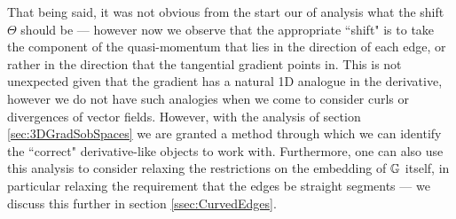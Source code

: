 That being said, it was not obvious from the start our of analysis what the shift $\Theta$ should be --- however now we observe that the appropriate ``shift" is to take the component of the quasi-momentum that lies in the direction of each edge, or rather in the direction that the tangential gradient points in.
This is not unexpected given that the gradient has a natural 1D analogue in the derivative, however we do not have such analogies when we come to consider curls or divergences of vector fields.
However, with the analysis of section \ref{sec:3DGradSobSpaces} we are granted a method through which we can identify the ``correct" derivative-like objects to work with.
Furthermore, one can also use this analysis to consider relaxing the restrictions on the embedding of $\mathbb{G}$ itself, in particular relaxing the requirement that the edges be straight segments --- we discuss this further in section \ref{ssec:CurvedEdges}.